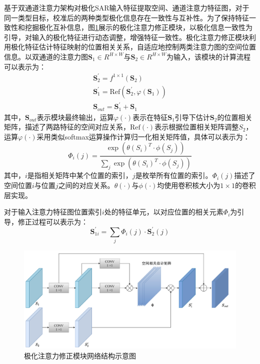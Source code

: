 基于双通道注意力架构对极化SAR输入特征提取空间、通道注意力特征图，对于同一类型目标，校准后的两种类型极化信息存在一致性与互补性。为了保持特征一致性和挖掘极化互补信息，图\ref{DPEN_WFM}展示的极化注意力修正模块，以极化信息一致性为引导，对输入的极化特征进行动态调整，增强特征一致性。极化注意力修正模块利用极化特征估计特征映射的位置相关关系，自适应地控制两类注意力图的空间位置信息。以双通道的注意力图$\textbf{S}_1\in R^{H \times W}$与$\textbf{S}_2\in R^{H \times W}$为输入，该模块的计算流程可以表示为：
\begin{gather}
    \textbf{S}_{2}^{\prime}=f^{1\times 1}\left( \textbf{S}_2 \right)
    \\
    \textbf{S}_{1}^{\prime}=\mathrm{Ref}\left( \textbf{S}_{2}^{\prime},\varphi \left( \textbf{S}_1 \right) \right)
    \\
    \textbf{S}_{out}=\textbf{S}_{1}^{\prime}+\textbf{S}_1
\end{gather}
其中，$\textbf{S}_{out}$表示模块最终输出，运算$\varphi(\cdot)$表示在特征$\textbf{S}_1$引导下估计$\textbf{S}_2$的位置相关矩阵，描述了两路特征的空间对应关系，$\mathrm{Ref}(\cdot)$表示根据位置相关矩阵调整$S_{2}$，运算$\varphi(\cdot)$采用类似softmax运算操作计算归一化相关矩阵值，具体可以表示为：
\begin{equation}
    \Phi _i\left( j \right) =\frac{\exp \left( \theta \left( S_i \right) ^T\cdot \phi \left( S_j \right) \right)}{\sum_j{\exp \left( \theta \left( S_i \right) ^T\cdot \phi \left( S_j \right) \right)}}
\end{equation}
其中，$i$是指相关矩阵中某个位置的索引，$j$是枚举所有位置的索引。$\Phi_i(j)$描述了空间位置$i$与位置$j$之间的对应关系。$\theta(\cdot)$与$\phi(\cdot)$均使用卷积核大小为$1\times 1$的卷积层实现。

对于输入注意力特征图位置索引$i$处的特征单元，以对应位置的相关元素$\Phi_i$为引导，修正过程可以表示为：
\begin{equation}
    \textbf{S}_{1i}^{\prime}=\sum_j{\Phi _i\left( j \right) \cdot \textbf{S}_{2}^{\prime}\left( j \right)}
\end{equation}

\begin{figure}[h]
    \centering
    \includegraphics[width=14cm]{pic/chapter3/极化注意力修正.pdf}
    \caption{极化注意力修正模块网络结构示意图}
    \label{DPEN_WFM}
\end{figure}

